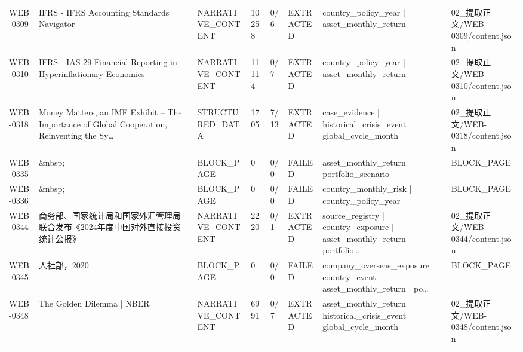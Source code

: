 \begin{landscape}
\begin{longtable}{p{1.8cm}p{4.2cm}p{3.0cm}p{1.4cm}p{1.6cm}p{2.4cm}p{4.2cm}p{4.2cm}}
WEB-0309 & IFRS - IFRS Accounting Standards Navigator & NARRATIVE\_\allowbreak{}CONTENT & 10258 & 0/\allowbreak{}6 & EXTRACTED & country\_\allowbreak{}policy\_\allowbreak{}year | asset\_\allowbreak{}monthly\_\allowbreak{}return & 02\_\allowbreak{}提取正文/\allowbreak{}WEB-0309/\allowbreak{}content.json\\
WEB-0310 & IFRS - IAS 29 Financial Reporting in Hyperinflationary Economies & NARRATIVE\_\allowbreak{}CONTENT & 11114 & 0/\allowbreak{}7 & EXTRACTED & country\_\allowbreak{}policy\_\allowbreak{}year | asset\_\allowbreak{}monthly\_\allowbreak{}return & 02\_\allowbreak{}提取正文/\allowbreak{}WEB-0310/\allowbreak{}content.json\\
WEB-0318 & Money Matters, an IMF Exhibit -- The Importance of Global Cooperation, Reinventing the Sy… & STRUCTURED\_\allowbreak{}DATA & 1705 & 7/\allowbreak{}13 & EXTRACTED & case\_\allowbreak{}evidence | historical\_\allowbreak{}crisis\_\allowbreak{}event | global\_\allowbreak{}cycle\_\allowbreak{}month & 02\_\allowbreak{}提取正文/\allowbreak{}WEB-0318/\allowbreak{}content.json\\
WEB-0335 & \&nbsp; & BLOCK\_\allowbreak{}PAGE & 0 & 0/\allowbreak{}0 & FAILED & asset\_\allowbreak{}monthly\_\allowbreak{}return | portfolio\_\allowbreak{}scenario & BLOCK\_\allowbreak{}PAGE\\
WEB-0336 & \&nbsp; & BLOCK\_\allowbreak{}PAGE & 0 & 0/\allowbreak{}0 & FAILED & country\_\allowbreak{}monthly\_\allowbreak{}risk | country\_\allowbreak{}policy\_\allowbreak{}year & BLOCK\_\allowbreak{}PAGE\\
WEB-0344 & 商务部、国家统计局和国家外汇管理局联合发布《2024年度中国对外直接投资统计公报》 & NARRATIVE\_\allowbreak{}CONTENT & 2220 & 0/\allowbreak{}1 & EXTRACTED & source\_\allowbreak{}registry | country\_\allowbreak{}exposure | asset\_\allowbreak{}monthly\_\allowbreak{}return | portfolio… & 02\_\allowbreak{}提取正文/\allowbreak{}WEB-0344/\allowbreak{}content.json\\
WEB-0345 & 人社部，2020 & BLOCK\_\allowbreak{}PAGE & 0 & 0/\allowbreak{}0 & FAILED & company\_\allowbreak{}overseas\_\allowbreak{}exposure | country\_\allowbreak{}event | asset\_\allowbreak{}monthly\_\allowbreak{}return | po… & BLOCK\_\allowbreak{}PAGE\\
WEB-0348 & The Golden Dilemma | NBER & NARRATIVE\_\allowbreak{}CONTENT & 6991 & 0/\allowbreak{}7 & EXTRACTED & asset\_\allowbreak{}monthly\_\allowbreak{}return | historical\_\allowbreak{}crisis\_\allowbreak{}event | global\_\allowbreak{}cycle\_\allowbreak{}month & 02\_\allowbreak{}提取正文/\allowbreak{}WEB-0348/\allowbreak{}content.json\\

\end{longtable}
\end{landscape}
